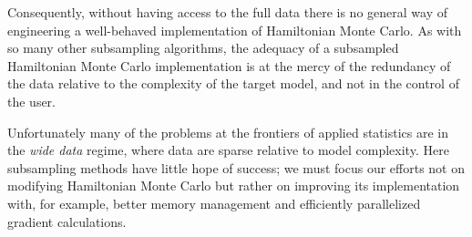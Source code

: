 \documentclass{article}
\begin{document}
Consequently, without having access to the full data there is no general way of 
engineering a well-behaved implementation of Hamiltonian Monte Carlo.  As with 
so many other subsampling algorithms, the adequacy of a subsampled Hamiltonian
Monte Carlo implementation is at the mercy of the redundancy of the data
relative to the complexity of the target model, and not in the control of the user.

Unfortunately many of the problems at the frontiers of applied statistics are 
in the \textit{wide data} regime, where data are sparse relative to model 
complexity.  Here subsampling methods have little hope of success;
we must focus our efforts not on modifying Hamiltonian Monte Carlo but rather
on improving its implementation with, for example, better memory management 
and efficiently parallelized gradient calculations.





\end{document}
